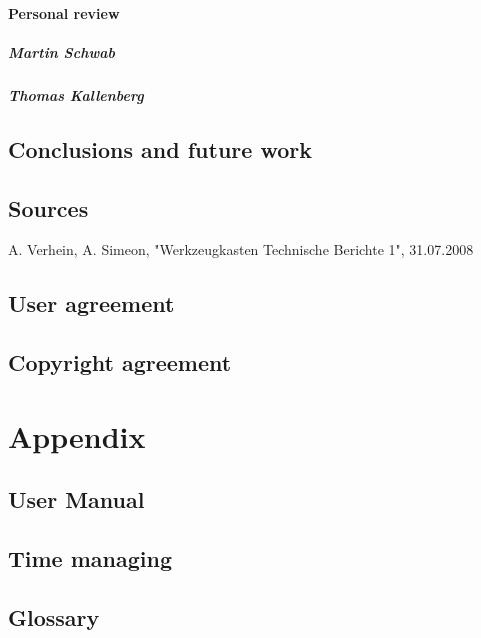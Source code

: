 \documentclass[a4paper,12pt]{scrreprt}
\begin{document}
\subsection{Personal review}

\subsubsection{Martin Schwab}

\subsubsection{Thomas Kallenberg}

\chapter{Conclusions and future work}
\thispagestyle{fancy}

\chapter{Sources}
\thispagestyle{fancy}
A. Verhein, A. Simeon, "Werkzeugkasten Technische Berichte 1", 31.07.2008

\chapter*{User agreement}
\chapter*{Copyright agreement}
\part{Appendix}

\chapter*{User Manual}
\chapter*{Time managing}
\chapter*{Glossary}

\thispagestyle{fancy}
\end{document}
